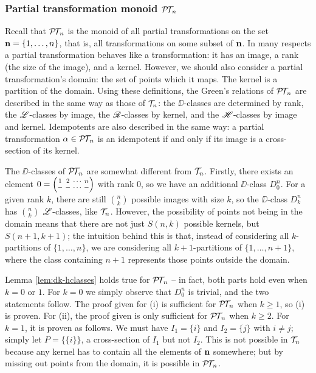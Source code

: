 \subsubsection{Partial transformation monoid $\mathcal{P\!T\!}_n$}
\label{sec:princfact-ptn}
Recall that $\mathcal{P\!T\!}_n$ is the monoid of all partial transformations on the set
$\mathbf{n} = \{1, \ldots, n\}$, that is, all transformations on some subset of $\mathbf{n}$.
In many respects a partial transformation behaves like a transformation: it has
an image, a rank (the size of the image), and a kernel.  However, we should also
consider a partial transformation's domain: the set of points which it maps.
The kernel is a partition of the domain.  Using these definitions, the Green's
relations of $\mathcal{P\!T\!}_n$ are described in the same way as those of $\mathcal{T}_n$: the
$\DD$-classes are determined by rank, the $\mathrel{\mathscr{L}}$-classes by image, the
$\mathrel{\mathscr{R}}$-classes by kernel, and the $\mathrel{\mathscr{H}}$-classes by image and kernel.  Idempotents
are also described in the same way: a partial transformation $\alpha \in \mathcal{P\!T\!}_n$
is an idempotent if and only if its image is a cross-section of its kernel.

The $\DD$-classes of $\mathcal{P\!T\!}_n$ are somewhat different from $\mathcal{T}_n$.  Firstly, there
exists an element $0 = \transN---$ with rank $0$, so we have an additional
$\DD$-class $D_0^n$.  For a given rank $k$, there are still $\binom{n}{k}$
possible images with size $k$, so the $\DD$-class $D_k^n$ has $\binom{n}{k}$
$\mathrel{\mathscr{L}}$-classes, like $\mathcal{T}_n$.  However, the possibility of points not being in the
domain means that there are not just $S(n,k)$ possible kernels, but
$S(n+1, k+1)$; the intuition behind this is that, instead of considering all
$k$-partitions of $\{1, \ldots, n\}$, we are considering all $k+1$-partitions of
$\{1, \ldots, n+1\}$, where the class containing $n+1$ represents those points
outside the domain.

Lemma \ref{lem:dk-hclasses} holds true for $\mathcal{P\!T\!}_n$ -- in fact, both parts hold
even when $k = 0$ or $1$.  For $k=0$ we simply observe that $D_0^n$ is trivial,
and the two statements follow.  The proof given for (i) is sufficient for
$\mathcal{P\!T\!}_n$ when $k \geq 1$, so (i) is proven.  For (ii), the proof given is only
sufficient for $\mathcal{P\!T\!}_n$ when $k \geq 2$.  For $k=1$, it is proven as follows.  We
must have $I_1 = \{i\}$ and $I_2 = \{j\}$ with $i \neq j$; simply let
$P = \big\{\{i\}\big\}$, a cross-section of $I_1$ but not $I_2$.  This is not
possible in $\mathcal{T}_n$ because any kernel has to contain all the elements of $\mathbf{n}$
somewhere; but by missing out points from the domain, it is possible in $\mathcal{P\!T\!}_n$.

